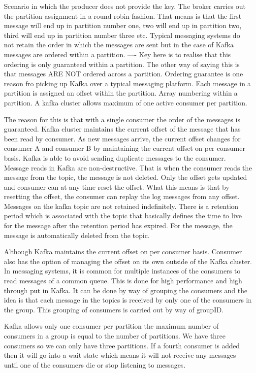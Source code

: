 Scenario in which the producer does not provide the key.
The broker carries out the partition assignment in a round robin fashion.
That means is that the first message will end up in partition number one, two will end up in partition two, third will end up in partition number three etc.
Typical messaging systems do not retain the order in which the messages are sent but in the case of Kafka messages are ordered within a partition.
---- Key here is to realise that this ordering is only guaranteed within a partition.
The other way of saying this is that messages ARE NOT ordered across a partition.
Ordering guarantee is one reason fro picking up Kafka over a typical messaging platform.
Each message in a partition is assigned an offset within the partition. Array numbering within a partition.
A kafka cluster allows maximum of one active consumer per partition.

The reason for this is that with a single consumer the order of the messages is guaranteed.
Kafka cluster maintains the current offset of the message that has been read by consumer.
As new messages arrive, the current offset changes for consumer A and consumer B by maintaining the current offset on per consumer basis.
Kafka is able to avoid sending duplicate messages to the consumer.
Message reads in Kafka are non-destructive.
That is when the consumer reads the message from the topic, the message is not deleted. Only the offset gets updated and consumer can at any time reset the offset.
What this means is that by resetting the offset, the consumer can replay the log messages from any offset.
Messages on the kafka topic are not retained indefinitely.
There is a retention period which is associated with the topic that basically defines the time to live for the message after the retention period has expired.
For the message, the message is automatically deleted from the topic.

Although Kafka maintains the current offset on per consumer basis.
Consumer also has the option of managing the offset on its own outside of the Kafka cluster.
In messaging systems, it is common for multiple instances of the consumers to read messages of a common queue.
This is done for high performance and high through put in Kafka.
It can be done by way of grouping the consumers and the idea is that each message in the topics is received by only one of the consumers in the group.
This grouping of consumers is carried out by way of groupID.

Kafka allows only one consumer per partition the maximum number of consumers in a group is equal to the number of partitions.
We have three consumers so we can only have three partitions.
If a fourth consumer is added then it will go into a wait state which means it will not receive any messages until one of the consumers die or stop listening to messages.


